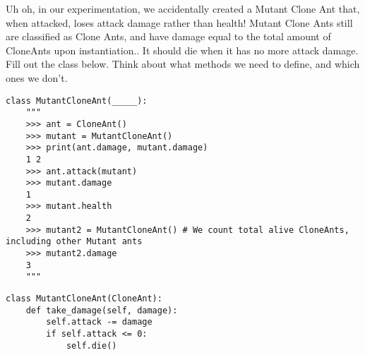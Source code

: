 \question Uh oh, in our experimentation, we accidentally created a Mutant Clone Ant that, when attacked, loses attack damage rather than health! Mutant Clone Ants still are classified as Clone Ants, and have damage equal to the total amount of CloneAnts upon instantiation.. It should die when it has no more attack damage. Fill out the class below. Think about what methods we need to define, and which ones we don't.
\newpage
\begin{lstlisting}
class MutantCloneAnt(_____):
    """
    >>> ant = CloneAnt()
    >>> mutant = MutantCloneAnt()
    >>> print(ant.damage, mutant.damage)
    1 2
    >>> ant.attack(mutant)
    >>> mutant.damage
    1
    >>> mutant.health
    2
    >>> mutant2 = MutantCloneAnt() # We count total alive CloneAnts, including other Mutant ants
    >>> mutant2.damage
    3
    """

\end{lstlisting}

\begin{solution}[1.0in]
\begin{lstlisting}
class MutantCloneAnt(CloneAnt):
    def take_damage(self, damage):
        self.attack -= damage
        if self.attack <= 0:
            self.die()
\end{lstlisting}
\end{solution}
